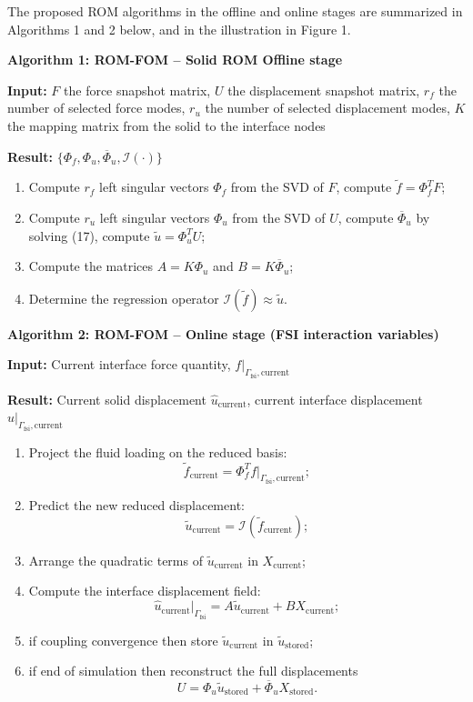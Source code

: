 \documentclass[11pt]{article}
\begin{document}
The proposed ROM algorithms in the offline and online stages are summarized in Algorithms 1 and 2 below, and in the illustration in Figure 1.

\bigskip
\noindent\textbf{Algorithm 1: ROM-FOM -- Solid ROM Offline stage}

\noindent\textbf{Input:} $F$ the force snapshot matrix, $U$ the displacement snapshot matrix, $r_f$ the number of selected force modes, $r_u$ the number of selected displacement modes, $K$ the mapping matrix from the solid to the interface nodes

\noindent\textbf{Result:} $\{\Phi_f,\Phi_u,\overline{\Phi}_u,\mathcal{I}(\cdot)\}$

\begin{enumerate}
\item Compute $r_f$ left singular vectors $\Phi_f$ from the SVD of $F$, compute $\tilde{f} = \Phi_f^{T}F$;
\item Compute $r_u$ left singular vectors $\Phi_u$ from the SVD of $U$, compute $\overline{\Phi}_u$ by solving (17), compute $\tilde{u} = \Phi_u^{T}U$;
\item Compute the matrices $A = K\Phi_u$ and $B = K\overline{\Phi}_u$;
\item Determine the regression operator $\mathcal{I}(\tilde{f}) \approx \tilde{u}$.
\end{enumerate}

\bigskip
\noindent\textbf{Algorithm 2: ROM-FOM -- Online stage (FSI interaction variables)}

\noindent\textbf{Input:} Current interface force quantity, $f|_{\Gamma_{\mathrm{fsi}},\mathrm{current}}$

\noindent\textbf{Result:} Current solid displacement $\hat{u}_{\mathrm{current}}$, current interface displacement $\hat{u}|_{\Gamma_{\mathrm{fsi}},\mathrm{current}}$

\begin{enumerate}
\item Project the fluid loading on the reduced basis:
\[
\tilde{f}_{\mathrm{current}} = \Phi_f^{T}f|_{\Gamma_{\mathrm{fsi}},\mathrm{current}};
\]
\item Predict the new reduced displacement:
\[
\tilde{u}_{\mathrm{current}} = \mathcal{I}(\tilde{f}_{\mathrm{current}});
\]
\item Arrange the quadratic terms of $\tilde{u}_{\mathrm{current}}$ in $X_{\mathrm{current}}$;
\item Compute the interface displacement field:
\[
\hat{u}_{\mathrm{current}}|_{\Gamma_{\mathrm{fsi}}}
=
A\tilde{u}_{\mathrm{current}} + BX_{\mathrm{current}};
\]
\item if coupling convergence then store $\tilde{u}_{\mathrm{current}}$ in $\tilde{u}_{\mathrm{stored}}$;
\item if end of simulation then reconstruct the full displacements
\[
U = \Phi_u \tilde{u}_{\mathrm{stored}} + \overline{\Phi}_u X_{\mathrm{stored}}.
\]
\end{enumerate}
\end{document}
